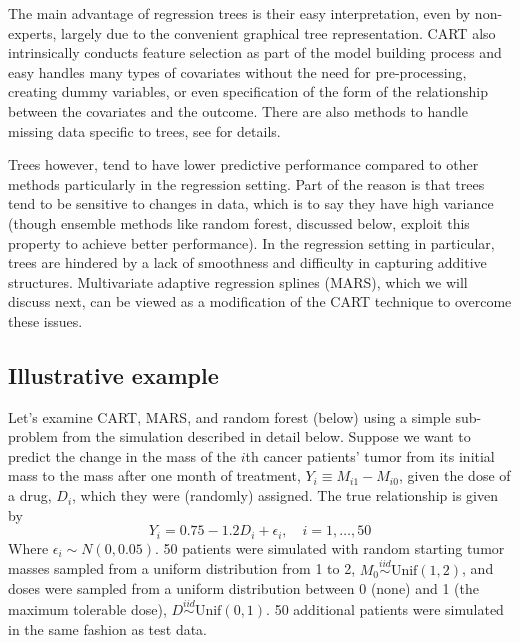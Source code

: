 \documentclass[12pt]{article}
\begin{document}
The main advantage of regression trees is their easy interpretation, even by non-experts, largely due to the convenient graphical tree representation. CART also intrinsically conducts feature selection as part of the model building process and easy handles many types of covariates without the need for pre-processing, creating dummy variables, or even specification of the form of the relationship between the covariates and the outcome. There are also methods to handle missing data specific to trees, see \textcite{esl} for details.

Trees however, tend to have lower predictive performance compared to other methods particularly in the regression setting. Part of the reason is that trees tend to be sensitive to changes in data, which is to say they have high variance (though ensemble methods like random forest, discussed below, exploit this property to achieve better performance). In the regression setting in particular, trees are hindered by a lack of smoothness and difficulty in capturing additive structures. Multivariate adaptive regression splines (MARS), which we will discuss next, can be viewed as a modification of the CART technique to overcome these issues.


\subsection{Illustrative example} %
\label{sub:cart-ex}

Let's examine CART, MARS, and random forest (below) using a simple sub-problem from the simulation described in detail below. Suppose we want to predict the change in the mass of the $i$th cancer patients' tumor from its initial mass to the mass after one month of treatment, $Y_{i} \equiv M_{i1} - M_{i0}$, given the dose of a drug, $D_{i}$, which they were (randomly) assigned. The true relationship is given by
\begin{equation}
  Y_{i} = 0.75 - 1.2 D_{i} + \epsilon_{i}, \quad i = 1, \ldots, 50
\end{equation}
Where $\epsilon_{i} \sim N(0, 0.05)$. 50 patients were simulated with random starting tumor masses sampled from a uniform distribution from 1 to 2, $M_{0} \overset{iid}{\sim} \text{Unif}(1, 2)$, and doses were sampled from a uniform distribution between 0 (none) and 1 (the maximum tolerable dose), $D \overset{iid}{\sim} \text{Unif}(0, 1)$. 50 additional patients were simulated in the same fashion as test data.
\end{document}
